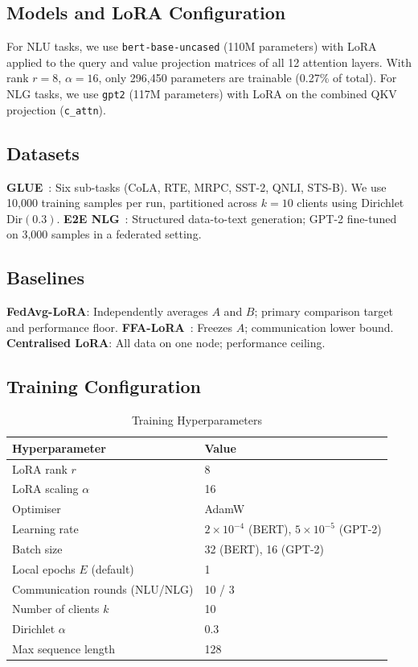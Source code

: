 \documentclass[conference]{IEEEtran}
\begin{document}
\subsection{Models and LoRA Configuration}
For NLU tasks, we use \texttt{bert-base-uncased} (110M parameters) with LoRA
applied to the query and value projection matrices of all 12 attention layers.
With rank $r=8$, $\alpha=16$, only 296,450 parameters are trainable
(0.27\% of total). For NLG tasks, we use \texttt{gpt2} (117M parameters) with
LoRA on the combined QKV projection (\texttt{c\_attn}).

\subsection{Datasets}
\textbf{GLUE}~\cite{b_wang}: Six sub-tasks (CoLA, RTE, MRPC, SST-2, QNLI,
STS-B). We use 10,000 training samples per run, partitioned across $k=10$
clients using Dirichlet $\mathrm{Dir}(0.3)$.\quad
\textbf{E2E NLG}~\cite{b_novikova}: Structured data-to-text generation;
GPT-2 fine-tuned on 3,000 samples in a federated setting.

\subsection{Baselines}
\textbf{FedAvg-LoRA}: Independently averages $A$ and $B$; primary comparison
target and performance floor.
\textbf{FFA-LoRA}~\cite{b_ffalora}: Freezes $A$; communication lower bound.
\textbf{Centralised LoRA}: All data on one node; performance ceiling.

\subsection{Training Configuration}

\begin{table}[t]
\caption{Training Hyperparameters}
\label{tab:hparams}
\begin{center}
\begin{tabular}{|l|l|}
\hline
\textbf{Hyperparameter} & \textbf{Value} \\
\hline
LoRA rank $r$                  & 8 \\
LoRA scaling $\alpha$          & 16 \\
Optimiser                      & AdamW \\
Learning rate                  & $2\times10^{-4}$ (BERT), $5\times10^{-5}$ (GPT-2) \\
Batch size                     & 32 (BERT), 16 (GPT-2) \\
Local epochs $E$ (default)     & 1 \\
Communication rounds (NLU/NLG) & 10 / 3 \\
Number of clients $k$          & 10 \\
Dirichlet $\alpha$             & 0.3 \\
Max sequence length            & 128 \\
\hline
\end{tabular}
\end{center}
\end{table}
\end{document}
